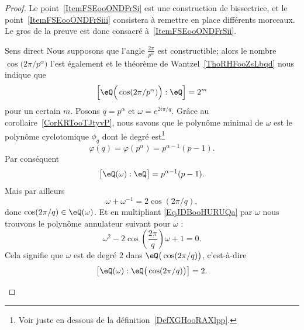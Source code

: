 \begin{proof}
    Le point~\ref{ItemFSEooONDFrSi} est une construction de bissectrice, et le point~\ref{ItemFSEooONDFrSiii} consistera à remettre en place différents morceaux. Le gros de la preuve est donc consacré à~\ref{ItemFSEooONDFrSii}.
    \begin{subproof}
        \item[Sens direct]
            Nous supposons que l'angle \( \frac{ 2\pi }{ p^{\alpha} }\) est constructible; alors le nombre \( \cos\big( 2\pi/p^{\alpha} \big)\) l'est également et le théorème de Wantzel~\ref{ThoRHFooZsLbqd} nous indique que
            \begin{equation}
                \left[ \eQ\Big( \cos(2\pi/p^{\alpha}) \Big):\eQ \right]=2^m
            \end{equation}
            pour un certain \( m\). Posons \( q=p^{\alpha}\) et \( \omega= e^{2i\pi/q}\). Grâce au corollaire~\ref{CorKRTooTJtyvP}, nous savons que le polynôme minimal de \( \omega\) est le polynôme cyclotomique \( \phi_q\) dont le
            degré est\footnote{Voir juste en dessous de la définition~\ref{DefXGHooRAXlpp}.}         %
            \begin{equation}
                \varphi(q)=\varphi(p^{\alpha})=p^{\alpha-1}(p-1).
            \end{equation}
            Par conséquent
            \begin{equation}
                \big[ \eQ(\omega):\eQ \big]=p^{\alpha-1}(p-1).
            \end{equation}
            Mais par ailleurs
            \begin{equation}    \label{EqJDBooHURUQa}
                \omega+\omega^{-1}=2\cos(2\pi/q),
            \end{equation}
            donc \( \cos(2\pi/q)\in \eQ(\omega)\). Et en multipliant \eqref{EqJDBooHURUQa} par \( \omega\) nous trouvons le polynôme annulateur suivant pour \( \omega\) :
            \begin{equation}
                \omega^2-2\cos\left( \frac{ 2\pi }{ q } \right)\omega+1=0.
            \end{equation}
            Cela signifie que \( \omega\) est de degré \( 2\) dans \( \eQ\big( \cos(2\pi/q) \big)\), c'est-à-dire
            \begin{equation}    \label{EqSJXooRCLJyt}
                \big[ \eQ(\omega):\eQ\big( \cos(2\pi/q) \big) \big]=2.
            \end{equation}

\end{subproof}
\end{proof}
